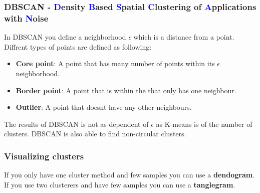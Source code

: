 \subsubsection{DBSCAN - \textcolor{blue}{D}ensity \textcolor{blue}{B}ased \textcolor{blue}{S}patial \textcolor{blue}{C}lustering of \textcolor{blue}{A}pplications with \textcolor{blue}{N}oise}
In DBSCAN you define a neighborhood $\epsilon$ which is a distance from a point. Diffrent types of points are defined as following:
\begin{itemize}
    \item \textbf{Core point}: A point that has many number of points within its $\epsilon$ neighborhood.
    \item \textbf{Border point}: A point that is within the that only has one neighbour.
    \item \textbf{Outlier}: A point that doesnt have any other neighbours.
\end{itemize}
The results of DBSCAN is not as dependent of $\epsilon$ as K-means is of the number of clusters. DBSCAN is also able to find non-circular clusters. \newline

\subsubsection{Visualizing clusters}
If you only have one cluster method and few samples you can use a \textbf{dendogram}. If you use two clusterers and have few samples you can use a \textbf{tanglegram}.


